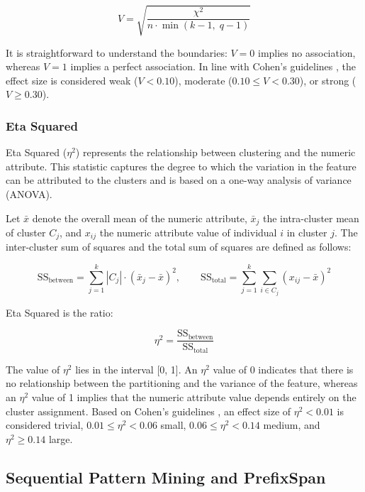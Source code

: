 \begin{equation}
    V = \sqrt{\frac{\chi^2}{n \cdot \min(k-1,\; q-1)}}
    \label{eq:cramer_v}
\end{equation}

It is straightforward to understand the boundaries: $V=0$ implies no association, whereas $V=1$ implies a perfect association. In line with Cohen's guidelines \cite{cohen1988}, the effect size is considered weak ($V<0.10$), moderate ($0.10 \leq V<0.30$), or strong ($V \geq 0.30$).

\subsubsection*{Eta Squared}

Eta Squared ($\eta^2$) represents the relationship between clustering and the numeric attribute. This statistic captures the degree to which the variation in the feature can be attributed to the clusters and is based on a one-way analysis of variance (ANOVA).

Let $\bar{x}$ denote the overall mean of the numeric attribute, $\bar{x}_j$ the intra-cluster mean of cluster $C_j$, and $x_{ij}$ the numeric attribute value of individual $i$ in cluster $j$. The inter-cluster sum of squares and the total sum of squares are defined as follows:

\begin{equation}
    \mathrm{SS}_{\mathrm{between}} = \sum_{j=1}^{k} |C_j| \cdot (\bar{x}_j - \bar{x})^2, \qquad
    \mathrm{SS}_{\mathrm{total}} = \sum_{j=1}^{k} \sum_{i \in C_j} (x_{ij} - \bar{x})^2
    \label{eq:ss}
\end{equation}

Eta Squared is the ratio:

\begin{equation}
    \eta^2 = \frac{\mathrm{SS}_{\mathrm{between}}}{\mathrm{SS}_{\mathrm{total}}}
    \label{eq:eta_squared}
\end{equation}

The value of $\eta^2$ lies in the interval [0, 1]. An $\eta^2$ value of 0 indicates that there is no relationship between the partitioning and the variance of the feature, whereas an $\eta^2$ value of 1 implies that the numeric attribute value depends entirely on the cluster assignment. Based on Cohen's guidelines \cite{cohen1988}, an effect size of $\eta^2 < 0.01$ is considered trivial, $0.01 \leq \eta^2 < 0.06$ small, $0.06 \leq \eta^2 < 0.14$ medium, and $\eta^2 \geq 0.14$ large.
\subsection{Sequential Pattern Mining and PrefixSpan}

